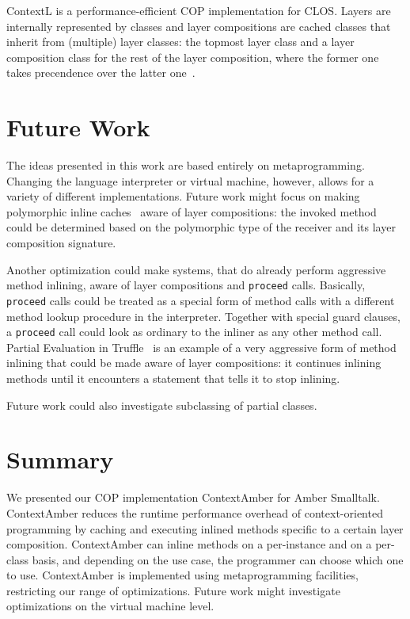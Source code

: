 \documentclass{sig-alternate}
\begin{document}
ContextL is a performance-efficient COP implementation for CLOS. Layers are internally represented by classes and layer compositions are cached classes that inherit from (multiple) layer classes: the topmost layer class and a layer composition class for the rest of the layer composition, where the former one takes precendence over the latter one~\cite{Costanza:2006:ELA:2111746.2111753}.

\section{Future Work}
The ideas presented in this work are based entirely on metaprogramming. Changing the language interpreter or virtual machine, however, allows for a variety of different implementations. Future work might focus on making polymorphic inline caches~\cite{Holzle:1991:ODO:646149.679193} aware of layer compositions: the invoked method could be determined based on the polymorphic type of the receiver and its layer composition signature.

Another optimization could make systems, that do already perform aggressive method inlining, aware of layer compositions and \texttt{proceed} calls. Basically, \texttt{proceed} calls could be treated as a special form of method calls with a different method lookup procedure in the interpreter. Together with special guard clauses, a \texttt{proceed} call could look as ordinary to the inliner as any other method call. Partial Evaluation in Truffle~\cite{Wurthinger:2013:OVR:2509578.2509581} is an example of a very aggressive form of method inlining that could be made aware of layer compositions: it continues inlining methods until it encounters a statement that tells it to stop inlining.

Future work could also investigate subclassing of partial classes.

\section{Summary}
We presented our COP implementation ContextAmber for Amber Smalltalk. ContextAmber reduces the runtime performance overhead of context-oriented programming by caching and executing inlined methods specific to a certain layer composition. ContextAmber can inline methods on a per-instance and on a per-class basis, and depending on the use case, the programmer can choose which one to use. ContextAmber is implemented using metaprogramming facilities, restricting our range of optimizations.
Future work might investigate optimizations on the virtual machine level.

%

%
%
\balancecolumns
\end{document}
